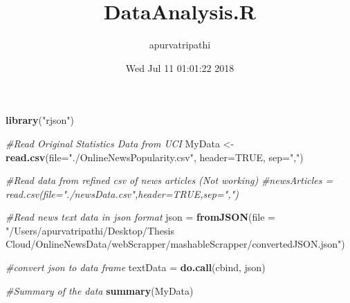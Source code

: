 \documentclass[]{article}
\title{DataAnalysis.R}
\author{apurvatripathi}
\date{Wed Jul 11 01:01:22 2018}
\newenvironment{Shaded}{\begin{snugshade}}{\end{snugshade}}
\newcommand{\KeywordTok}[1]{\textcolor[rgb]{0.13,0.29,0.53}{\textbf{#1}}}
\newcommand{\DataTypeTok}[1]{\textcolor[rgb]{0.13,0.29,0.53}{#1}}
\newcommand{\StringTok}[1]{\textcolor[rgb]{0.31,0.60,0.02}{#1}}
\newcommand{\CommentTok}[1]{\textcolor[rgb]{0.56,0.35,0.01}{\textit{#1}}}
\newcommand{\OtherTok}[1]{\textcolor[rgb]{0.56,0.35,0.01}{#1}}
\newcommand{\NormalTok}[1]{#1}
\begin{document}
\maketitle

\begin{Shaded}
\begin{Highlighting}[]
\KeywordTok{library}\NormalTok{(}\StringTok{"rjson"}\NormalTok{)}

\CommentTok{#Read Original Statistics Data from UCI}
\NormalTok{MyData <-}\StringTok{ }\KeywordTok{read.csv}\NormalTok{(}\DataTypeTok{file=}\StringTok{"./OnlineNewsPopularity.csv"}\NormalTok{, }\DataTypeTok{header=}\OtherTok{TRUE}\NormalTok{, }\DataTypeTok{sep=}\StringTok{","}\NormalTok{)}

\CommentTok{#Read data from refined csv of news articles (Not working)}
\CommentTok{#newsArticles = read.csv(file="./newsData.csv",header=TRUE,sep=",")}

\CommentTok{#Read news text data in json format}
\NormalTok{json =}\StringTok{ }\KeywordTok{fromJSON}\NormalTok{(}\DataTypeTok{file =} \StringTok{"/Users/apurvatripathi/Desktop/Thesis Cloud/OnlineNewsData/webScrapper/mashableScrapper/convertedJSON.json"}\NormalTok{)}

\CommentTok{#convert json to data frame}
\NormalTok{textData =}\StringTok{ }\KeywordTok{do.call}\NormalTok{(cbind, json)}


\CommentTok{#Summary of the data}
\KeywordTok{summary}\NormalTok{(MyData)}
\end{Highlighting}
\end{Shaded}
\end{document}
